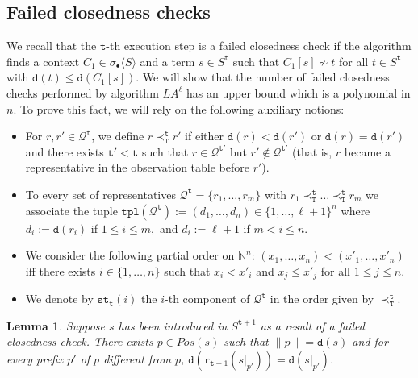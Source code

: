 \documentclass[preprint,12pt,english]{article}
\def\tpl{\mathtt{tpl}}
\def\hole{\bullet}
\def\tr{\mathtt{r}}
\def\tty{\mathtt{st}}
\def\cQ{\mathcal{Q}}
\def\depth{\mathtt{d}}
\newcommand\pair[1]{\langle{#1}\rangle}
\newcommand\comment[1]{}
\def\ty{\mathtt{t}}
\newtheorem{lemma}{Lemma}
\begin{document}
\subsection{Failed closedness checks}
We recall that the $\ty$-th execution step is a failed closedness check  if the algorithm finds a context $C_1\in\sigma_\hole\pair{S}$ and a term $s\in S^\ty$ such that $C_1[s]\nsim t$ for all $t\in S^\ty$ with $\depth(t)\leq \depth(C_1[s])$. 
We will show that the number of failed closedness checks performed by  algorithm $LA^\ell$ has an upper bound which is a polynomial in $n$. To prove this fact, we will rely on the following auxiliary notions:
\begin{itemize}
\item For $r,r'\in\cQ^\ty$, we define $r\prec^\ty_{\mathtt{T}} r'$ if either $\depth(r)<\depth(r')$ or $\depth(r)=\depth(r')$ and there exists $\ty'<\ty$ such that $r\in\cQ^{\ty'}$ but $r'\not\in\cQ^{\ty'}$ (that is, $r$ became a representative in the observation table before $r'$).
\item To every set of representatives $\cQ^\ty=\{r_1,\ldots,r_m\}$ with $r_1\prec^\ty_{\mathtt{T}}\ldots\prec^\ty_{\mathtt{T}} r_m$
we associate the tuple $\tpl(\cQ^\ty):=(d_1,\ldots,d_n)\in\{1,\ldots,\ell+1\}^n$ where  
$d_i:=
\depth(r_i)$ if $1\leq i\leq m,$ and $d_i:=\ell+1$ if $m < i\leq n.$
\item We consider the following  partial order on $\mathbb{N}^n$: $(x_1,\ldots,x_n) < (x'_1,\ldots,x'_n)$ iff there exists $i\in\{1,\ldots,n\}$ such that $x_i< x'_i$ and $x_j\leq x'_j$ for all $1\leq j\leq n$.
\item We denote by $\tty_\ty(i)$ the $i$-th component of  $\cQ^\ty$ in the order given by $\prec^{\ty}_{\mathtt{T}}$. 
\end{itemize}
\comment{
\begin{lemma}
\label{lmng}
Let $\mathbf{x}=(x_1,\ldots,x_n),\ \mathbf{y}= (y_1,\ldots,y_n)\in\mathbb{N}^n$ such that 
$x_1\leq \ldots\leq x_n$ and $y_1\leq \ldots \leq y_n.$ Then
$\{x_1,\ldots,x_n\}\prec_{\ms}\{y_1,\ldots,y_n\}.$ Then $\mathbf{x}<\mathbf{y}$.
\end{lemma}
\begin{proof}
Obvious.\qed
\end{proof}
\comment
It is easy to see that the following inequalities hold for all execution steps $\ty$: 
$$\tpl(\cQ^\ty)\geq\tpl(\cQ^{\ty+1})\text{ and }(1,\ldots,1)\leq \tpl(\cQ^\ty)\leq (\ell+1,\ldots,\ell+1).$$
}

\begin{lemma}
\label{lema8}
Suppose $s$ has been introduced in $S^{\ty+1}$ as a result of a failed closedness check. There exists  $p\in Pos(s)$ such that $\|p\|=\depth(s)$ and for every prefix $p'$ of $p$ different from $p$, $\depth(\tr_{\ty+1}(s|_{p'}))=\depth(s|_{p'})$.
\end{lemma}
\end{document}

